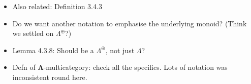 \documentclass{amsart}
\begin{document}
\begin{itemize}
\item Also related: Definition 3.4.3
\item Do we want another notation to emphasise the underlying monoid? (Think we settled on $\Lambda^{\oplus}$?)
\item Lemma 4.3.8: Should be a $\Lambda^{\oplus}$, not just $\Lambda$?
\item Defn of $\mathbf{\Lambda}$-multicategory: check all the specifics. Lots of notation was inconsistent round here.
\end{itemize}
\end{document}
